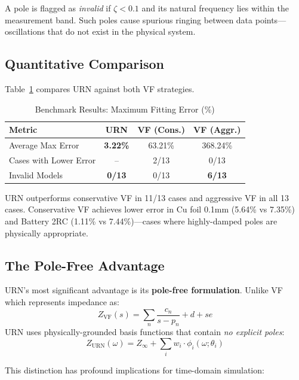 \documentclass{ieeeaccess}
\begin{document}
A pole is flagged as \textit{invalid} if $\zeta < 0.1$ and its natural frequency lies within the measurement band. Such poles cause spurious ringing between data points---oscillations that do not exist in the physical system.

\subsection{Quantitative Comparison}

Table~\ref{tab:benchmark} compares URN against both VF strategies.

\begin{table}[!t]
\caption{Benchmark Results: Maximum Fitting Error (\%)}
\label{tab:benchmark}
\centering
\begin{tabular}{@{}lccc@{}}
\toprule
\textbf{Metric} & \textbf{URN} & \textbf{VF (Cons.)} & \textbf{VF (Aggr.)} \\
\midrule
Average Max Error & \textbf{3.22\%} & 63.21\% & 368.24\% \\
Cases with Lower Error & -- & 2/13 & 0/13 \\
Invalid Models & \textbf{0/13} & 0/13 & \textbf{6/13} \\
\bottomrule
\end{tabular}
\end{table}

URN outperforms conservative VF in 11/13 cases and aggressive VF in all 13 cases. Conservative VF achieves lower error in Cu foil 0.1mm (5.64\% vs 7.35\%) and Battery 2RC (1.11\% vs 7.44\%)---cases where highly-damped poles are physically appropriate.

\subsection{The Pole-Free Advantage}

URN's most significant advantage is its \textbf{pole-free formulation}. Unlike VF which represents impedance as:
\begin{equation}
Z_{\text{VF}}(s) = \sum_{n} \frac{c_n}{s - p_n} + d + se
\end{equation}
URN uses physically-grounded basis functions that contain \textit{no explicit poles}:
\begin{equation}
Z_{\text{URN}}(\omega) = Z_\infty + \sum_i w_i \cdot \phi_i(\omega; \theta_i)
\end{equation}

This distinction has profound implications for time-domain simulation:
\end{document}
